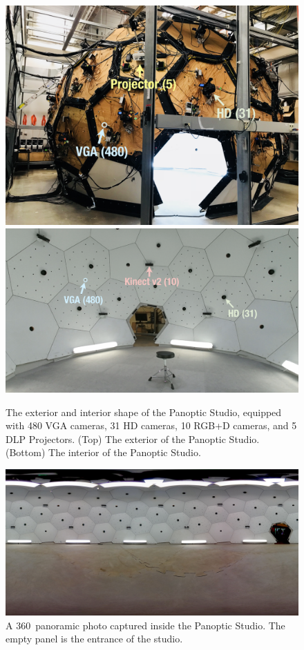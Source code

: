 \begin{figure}
	\centering       
	\includegraphics[trim=0 0 0 0,clip,width=\linewidth]{fig_system/dome_exterior2_label}
	\includegraphics[trim=0 0 0 0,clip,width=\linewidth]{fig_system/panoptic_inside}	
	\caption{The exterior and interior shape of the Panoptic Studio, equipped with  480 VGA cameras, 31 HD cameras, 10 RGB+D cameras, and 5 DLP Projectors. (Top) The exterior of the Panoptic Studio. (Bottom) The interior of the Panoptic Studio.} 
	\label{fig:dome_ext_int}
\end{figure}

\begin{figure}
	\centering       
	\includegraphics[trim=0 0 0 0,clip,width=\linewidth]{fig_system/dome_pano}	
	\caption{A 360\degree~panoramic photo captured inside the Panoptic Studio. The empty panel is the entrance of the studio.} 
	\label{fig:dome_panorama}
\end{figure}

